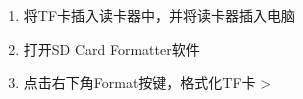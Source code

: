 \begin{enumerate}
\def\labelenumi{\arabic{enumi}.}
\tightlist
\item
  将TF卡插入读卡器中，并将读卡器插入电脑
\item
  打开SD Card
  Formatter软件
\item
  点击右下角Format按键，格式化TF卡
  \textgreater{}

\end{enumerate}

